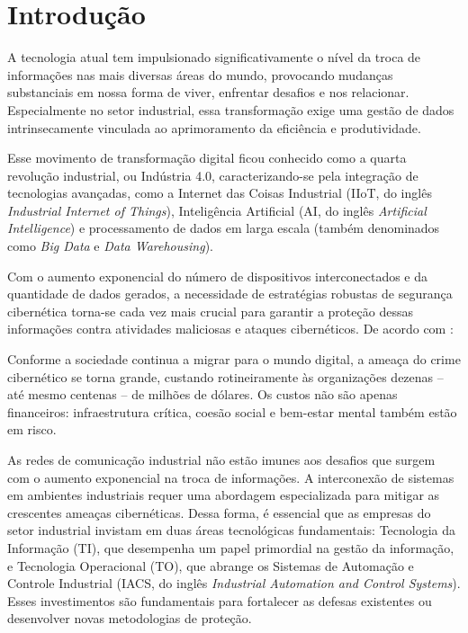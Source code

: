 

\chapter[Introdução]{Introdução} \label{cap:introducao}

    A tecnologia atual tem impulsionado significativamente o nível da troca de informações nas mais diversas áreas do mundo, provocando mudanças substanciais em nossa forma de viver, enfrentar desafios e nos relacionar. Especialmente no setor industrial, essa transformação exige uma gestão de dados intrinsecamente vinculada ao aprimoramento da eficiência e produtividade.
    
    Esse movimento de transformação digital ficou conhecido como a quarta revolução industrial, ou Indústria 4.0, caracterizando-se pela integração de tecnologias avançadas, como a Internet das Coisas Industrial (IIoT, do inglês \textit{Industrial Internet of Things}), Inteligência Artificial (AI, do inglês \textit{Artificial Intelligence}) e processamento de dados em larga escala (também denominados como \textit{Big Data} e \textit{Data Warehousing}).
    
    Com o aumento exponencial do número de dispositivos interconectados e da quantidade de dados gerados, a necessidade de estratégias robustas de segurança cibernética torna-se cada vez mais crucial para garantir a proteção dessas informações contra atividades maliciosas e ataques cibernéticos. De acordo com :
    
    \begin{citacao}
        Conforme a sociedade continua a migrar para o mundo digital, a ameaça do crime cibernético se torna grande, custando rotineiramente às organizações dezenas -- até mesmo centenas -- de milhões de dólares. Os custos não são apenas financeiros: infraestrutura crítica, coesão social e bem-estar mental também estão em risco.
    \end{citacao}

    As redes de comunicação industrial não estão imunes aos desafios que surgem com o aumento exponencial na troca de informações. A interconexão de sistemas em ambientes industriais requer uma abordagem especializada para mitigar as crescentes ameaças cibernéticas. Dessa forma, é essencial que as empresas do setor industrial invistam em duas áreas tecnológicas fundamentais: Tecnologia da Informação (TI), que desempenha um papel primordial na gestão da informação, e Tecnologia Operacional (TO), que abrange os Sistemas de Automação e Controle Industrial (IACS, do inglês \textit{Industrial Automation and Control Systems}). Esses investimentos são fundamentais para fortalecer as defesas existentes ou desenvolver novas metodologias de proteção.

